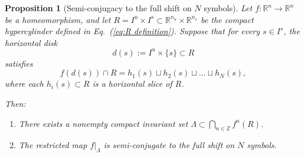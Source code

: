 \documentclass[12pt]{iopart}
\newtheorem{proposition}{Proposition}
\begin{document}
\begin{proposition}[Semi-conjugacy to the full shift on \( N \) symbols]\label{Semi-conjugacy to the full shift on N symbols}
Let \( f : \mathbb{R}^n \to \mathbb{R}^n \) be a homeomorphism, and let \( R = I^u \times I^s \subset \mathbb{R}^{n_u} \times \mathbb{R}^{n_s} \) be the compact hypercylinder defined in Eq.~(\ref{eq:R definition}). Suppose that for every \( s \in I^s \), the horizontal disk
\[
d(s) := I^u \times \{s\} \subset R
\]
satisfies
\[
f(d(s)) \cap R = h_1(s) \sqcup h_2(s) \sqcup \dots \sqcup h_N(s),
\]
where each \( h_i(s) \subset R \) is a horizontal slice of \( R \).

Then:
\begin{enumerate}
    \item There exists a nonempty compact invariant set \( \Lambda \subset \bigcap_{n \in \mathbb{Z}} f^n(R) \).
    \item The restricted map \( f|_\Lambda \) is semi-conjugate to the full shift on \( N \) symbols.
\end{enumerate}
\end{proposition}
\end{document}
